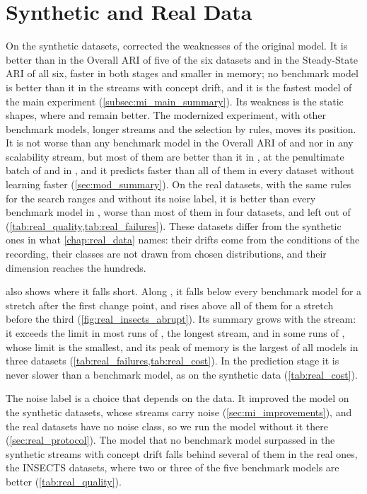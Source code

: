 \section{Synthetic and Real Data}
\label{sec:disc_data}

On the synthetic datasets, \MicroTEDAClusPlus corrected the weaknesses of the original model. It is better than \MicroTEDAClus in the Overall ARI of five of the six datasets and in the Steady-State ARI of all six, faster in both stages and smaller in memory; no benchmark model is better than it in the streams with concept drift, and it is the fastest model of the main experiment (\cref{subsec:mi_main_summary}). Its weakness is the static shapes, where \CluStream and \StreamKM remain better. The modernized experiment, with other benchmark models, longer streams and the selection by rules, moves its position. It is not worse than any benchmark model in the Overall ARI of \BenchmarkOne and \Cassini nor in any scalability stream, but most of them are better than it in \BenchmarkTwo, at the penultimate batch of \RandomRBFGeneratorEvents and in \ChameleonDSThree, and it predicts faster than all of them in every dataset without learning faster (\cref{sec:mod_summary}). On the real datasets, with the same rules for the search ranges and without its noise label, it is better than every benchmark model in \Shuttle, worse than most of them in four datasets, and left out of \Covertype (\cref{tab:real_quality,tab:real_failures}). These datasets differ from the synthetic ones in what \cref{chap:real_data} names: their drifts come from the conditions of the recording, their classes are not drawn from chosen distributions, and their dimension reaches the hundreds.

 also shows where it falls short. Along \InsectsAbrupt, it falls below every benchmark model for a stretch after the first change point, and rises above all of them for a stretch before the third (\cref{fig:real_insects_abrupt}). Its summary grows with the stream: it exceeds the limit in most runs of \Covertype, the longest stream, and in some runs of \Pendigits, whose limit is the smallest, and its peak of memory is the largest of all models in three datasets (\cref{tab:real_failures,tab:real_cost}). In the prediction stage it is never slower than a benchmark model, as on the synthetic data (\cref{tab:real_cost}).

The noise label is a choice that depends on the data. It improved the model on the synthetic datasets, whose streams carry noise (\cref{sec:mi_improvements}), and the real datasets have no noise class, so we run the model without it there (\cref{sec:real_protocol}). The model that no benchmark model surpassed in the synthetic streams with concept drift falls behind several of them in the real ones, the INSECTS datasets, where two or three of the five benchmark models are better (\cref{tab:real_quality}).

